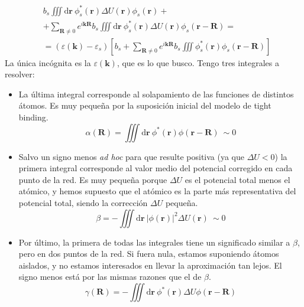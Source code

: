 \begin{equation}
\begin{split}
  &b_s \iiint \text{d}\mathbf{r}\ \phi_s^* (\mathbf{r}) \Delta
  U(\mathbf{r}) \phi_s (\mathbf{r}) + \\ &+ \sum_{\mathbf{R}\neq 0} e^{i
    \mathbf{k}\mathbf{R}} b_s \iiint \text{d}\mathbf{r}\ \phi_s^*
  (\mathbf{r}) \Delta U (\mathbf{r}) \phi_s (\mathbf{r}-\mathbf{R}) =
  \\
&= (\varepsilon (\mathbf{k}) - \varepsilon_s) [b_s +
\sum_{\mathbf{R}\neq 0} e^{i \mathbf{k} \mathbf{R}} b_s \iiint
\phi_s^* (\mathbf{r}) \phi_s (\mathbf{r}-\mathbf{R})]
\end{split}
\end{equation}
La única incógnita es la $\varepsilon(\mathbf{k})$, que es lo que
busco. Tengo tres integrales a resolver:
\begin{itemize}
\item La última integral corresponde al solapamiento de las funciones
  de distintos átomos. Es muy pequeña por la suposición inicial del
  modelo de tight binding.
\begin{equation}
  \alpha(\mathbf{R}) = \iiint \text{d}\mathbf{r}\ \phi^* (\mathbf{r})
  \phi(\mathbf{r}-\mathbf{R}) \ \sim 0
\end{equation}
\item Salvo un signo menos \emph{ad hoc} para que resulte positiva (ya
  que $\Delta U < 0$) la primera integral corresponde al valor medio
  del potencial corregido en cada punto de la red. Es muy pequeña
  porque $\Delta U$ es el potencial total menos el atómico, y hemos
  supuesto que el atómico es la parte más representativa del potencial
  total, siendo la corrección $\Delta U$ pequeña.
  \begin{equation}
    \beta = - \iiint \text{d}\mathbf{r}\
    |\phi(\mathbf{r})|^2 \Delta U (\mathbf{r}) \ \sim 0
  \end{equation}
\item Por último, la primera de todas las integrales tiene un
  significado similar a $\beta$, pero en dos puntos de la red. Si
  fuera nula, estamos suponiendo átomos aislados, y no estamos
  interesados en llevar la aproximación tan lejos. El signo menos está
  por las mismas razones que el de $\beta$.
  \begin{equation}
   \gamma (\mathbf{R}) = - \iiint \text{d}\mathbf{r}\ \phi^* (\mathbf{r}) \Delta U \phi(\mathbf{r}-\mathbf{R})
  \end{equation}
\end{itemize}

